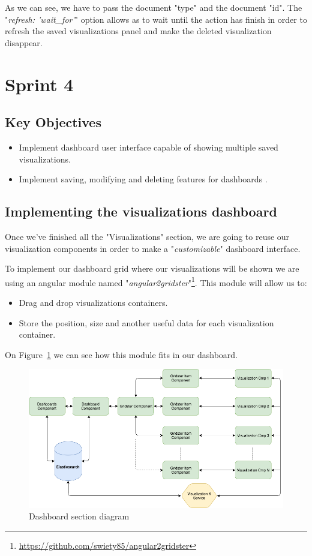 \documentclass[a4paper, 12pt, english]{book}
\begin{document}
As we can see, we have to pass the document "type" and the document "id". The "\textit{refresh: 'wait\_for'}" option allows as to wait until the action has finish in order to refresh the saved visualizations panel and make the deleted visualization disappear.


\section{Sprint 4}
\label{sec:sprint-4}

\subsection{Key Objectives}
\label{sec:key-objectives}
\begin{itemize}
    \item Implement dashboard user interface capable of showing multiple saved visualizations.
    \item Implement saving, modifying and deleting features for dashboards .
\end{itemize}

\subsection{Implementing the visualizations dashboard}
\label{sec:visualizations-dashboard}
Once we've finished all the "Visualizations" section, we are going to reuse our visualization components in order to make a "\textit{customizable}" dashboard interface.

To implement our dashboard grid where our visualizations will be shown we are using an angular module named "\textit{angular2gridster}"\footnote{\url{https://github.com/swiety85/angular2gridster}}. This module will allow us to:
\begin{itemize}
    \item Drag and drop visualizations containers.
    \item Store the position, size and another useful data for each visualization container.
\end{itemize}

On Figure~\ref{fig:dashboards-diagram} we can see how this module fits in our dashboard.
\begin{figure}
  \centering
  \includegraphics[width=15cm, keepaspectratio]{img/dashboards-diagram}
  \caption{Dashboard section diagram}
  \label{fig:dashboards-diagram}
\end{figure}
\end{document}

